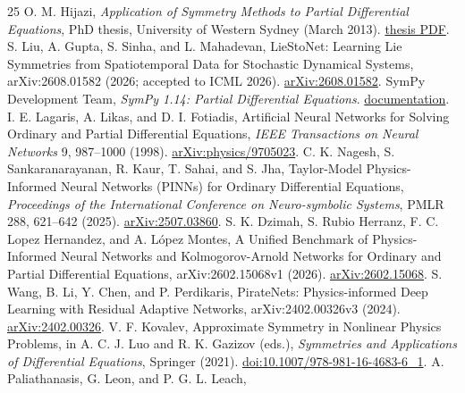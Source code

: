 \documentclass[11pt]{article}
\begin{document}
\begin{thebibliography}{25}
 O. M. Hijazi, \emph{Application of Symmetry Methods to
Partial Differential Equations}, PhD thesis, University of Western Sydney
(March 2013).
\href{https://researchers-admin.westernsydney.edu.au/ws/portalfiles/portal/94854495/uws_17137.pdf}{thesis PDF}.
 S. Liu, A. Gupta, S. Sinha, and L. Mahadevan,
LieStoNet: Learning Lie Symmetries from Spatiotemporal Data for Stochastic
Dynamical Systems, arXiv:2608.01582 (2026; accepted to ICML 2026).
\href{https://arxiv.org/abs/2608.01582}{arXiv:2608.01582}.
 SymPy Development Team, \emph{SymPy 1.14: Partial
Differential Equations}.
\href{https://docs.sympy.org/latest/modules/solvers/pde.html}{documentation}.
 I. E. Lagaris, A. Likas, and D. I. Fotiadis,
Artificial Neural Networks for Solving Ordinary and Partial Differential
Equations, \emph{IEEE Transactions on Neural Networks} 9, 987--1000 (1998).
\href{https://arxiv.org/abs/physics/9705023}{arXiv:physics/9705023}.
 C. K. Nagesh, S. Sankaranarayanan, R. Kaur, T. Sahai,
and S. Jha, Taylor-Model Physics-Informed Neural Networks (PINNs) for
Ordinary Differential Equations, \emph{Proceedings of the International
Conference on Neuro-symbolic Systems}, PMLR 288, 621--642 (2025).
\href{https://arxiv.org/abs/2507.03860}{arXiv:2507.03860}.
 S. K. Dzimah, S. Rubio Herranz, F. C. Lopez Hernandez, and
A. L\'opez Montes, A Unified Benchmark of Physics-Informed Neural Networks
and Kolmogorov-Arnold Networks for Ordinary and Partial Differential Equations,
arXiv:2602.15068v1 (2026).
\href{https://arxiv.org/abs/2602.15068}{arXiv:2602.15068}.
 S. Wang, B. Li, Y. Chen, and P. Perdikaris,
PirateNets: Physics-informed Deep Learning with Residual Adaptive Networks,
arXiv:2402.00326v3 (2024).
\href{https://arxiv.org/abs/2402.00326}{arXiv:2402.00326}.
 V. F. Kovalev, Approximate Symmetry in Nonlinear Physics
Problems, in A. C. J. Luo and R. K. Gazizov (eds.),
\emph{Symmetries and Applications of Differential Equations}, Springer (2021).
\href{https://doi.org/10.1007/978-981-16-4683-6_1}{doi:10.1007/978-981-16-4683-6\_1}.
 A. Paliathanasis, G. Leon, and P. G. L. Leach,

\end{thebibliography}
\end{document}
